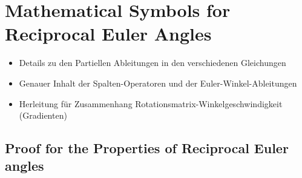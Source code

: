 \documentclass[robotics,article,submit,moreauthors,pdftex]{Definitions/mdpi}
\begin{document}




\appendix
\section{Mathematical Symbols for Reciprocal Euler Angles}



\begin{itemize}
    \item Details zu den Partiellen Ableitungen in den verschiedenen Gleichungen
    \item Genauer Inhalt der Spalten-Operatoren und der Euler-Winkel-Ableitungen
    \item Herleitung für Zusammenhang Rotationsmatrix-Winkelgeschwindigkeit (Gradienten)
\end{itemize}


\subsection{Proof for the Properties of Reciprocal Euler angles}
\label{sec:appendix_eulerreciproc}
\end{document}
